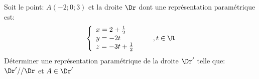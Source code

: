 \begin{exercice}
Soit le point: $A(-2;0;3)$ et la droite
    $\Dr$ dont une repr\'esentation param\'etrique est:
\[ 
\left\{
\begin{array}{ll}
x=2+\frac{t}{2}\\
y=-2t\\
z=-3t+\frac{1}{2}
\end{array}
\right.\qquad ,t\in\R
\]
  D\'eterminer une repr\'esentation param\'etrique de la droite
    $\Dr'$ telle que: $\Dr' // \Dr$ et $A\in\Dr'$


 
\end{exercice}
